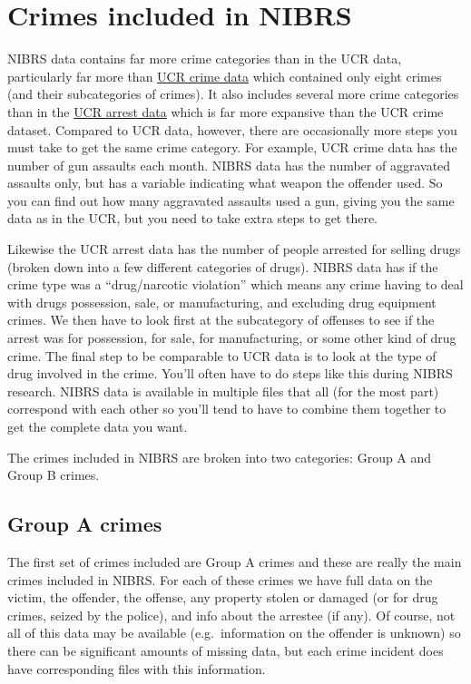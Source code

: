 \documentclass[
  12pt,
  openany]{book}
\begin{document}
\hypertarget{crimes-included-in-nibrs}{%
\section{Crimes included in NIBRS}\label{crimes-included-in-nibrs}}

NIBRS data contains far more crime categories than in the UCR data, particularly far more than \href{https://ucrbook.com/ucrGeneral.html\#crimes-in-the-offenses-known-and-clearances-by-arrest-dataset}{UCR crime data} which contained only eight crimes (and their subcategories of crimes). It also includes several more crime categories than in the \href{https://ucrbook.com/ucrGeneral.html\#crimes-in-the-arrests-by-age-sex-and-race-dataset}{UCR arrest data} which is far more expansive than the UCR crime dataset. Compared to UCR data, however, there are occasionally more steps you must take to get the same crime category. For example, UCR crime data has the number of gun assaults each month. NIBRS data has the number of aggravated assaults only, but has a variable indicating what weapon the offender used. So you can find out how many aggravated assaults used a gun, giving you the same data as in the UCR, but you need to take extra steps to get there.

Likewise the UCR arrest data has the number of people arrested for selling drugs (broken down into a few different categories of drugs). NIBRS data has if the crime type was a ``drug/narcotic violation'' which means any crime having to deal with drugs possession, sale, or manufacturing, and excluding drug equipment crimes. We then have to look first at the subcategory of offenses to see if the arrest was for possession, for sale, for manufacturing, or some other kind of drug crime. The final step to be comparable to UCR data is to look at the type of drug involved in the crime. You'll often have to do steps like this during NIBRS research. NIBRS data is available in multiple files that all (for the most part) correspond with each other so you'll tend to have to combine them together to get the complete data you want.

The crimes included in NIBRS are broken into two categories: Group A and Group B crimes.

\hypertarget{group-a-crimes}{%
\subsection{Group A crimes}\label{group-a-crimes}}

The first set of crimes included are Group A crimes and these are really the main crimes included in NIBRS. For each of these crimes we have full data on the victim, the offender, the offense, any property stolen or damaged (or for drug crimes, seized by the police), and info about the arrestee (if any). Of course, not all of this data may be available (e.g.~information on the offender is unknown) so there can be significant amounts of missing data, but each crime incident does have corresponding files with this information.
\end{document}
